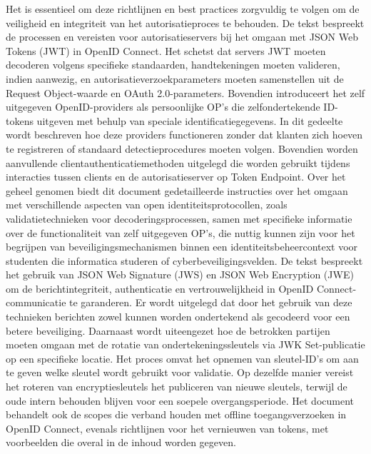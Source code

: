 Het is essentieel om deze richtlijnen en best practices zorgvuldig te volgen om de veiligheid en integriteit van het autorisatieproces te behouden.
\newline
De tekst bespreekt de processen en vereisten voor autorisatieservers bij het omgaan met JSON Web Tokens (JWT) in OpenID Connect. Het schetst dat servers JWT moeten decoderen volgens specifieke standaarden, handtekeningen moeten valideren, indien aanwezig, en autorisatieverzoekparameters moeten samenstellen uit de Request Object-waarde en OAuth 2.0-parameters.
\newline
Bovendien introduceert het zelf uitgegeven OpenID-providers als persoonlijke OP's die zelfondertekende ID-tokens uitgeven met behulp van speciale identificatiegegevens. In dit gedeelte wordt beschreven hoe deze providers functioneren zonder dat klanten zich hoeven te registreren of standaard detectieprocedures moeten volgen.
Bovendien worden aanvullende clientauthenticatiemethoden uitgelegd die worden gebruikt tijdens interacties tussen clients en de autorisatieserver op Token Endpoint.
\newline
Over het geheel genomen biedt dit document gedetailleerde instructies over het omgaan met verschillende aspecten van open identiteitsprotocollen, zoals validatietechnieken voor decoderingsprocessen, samen met specifieke informatie over de functionaliteit van zelf uitgegeven OP's, die nuttig kunnen zijn voor het begrijpen van beveiligingsmechanismen binnen een identiteitsbeheercontext voor studenten die informatica studeren of cyberbeveiligingsvelden.
\newline
De tekst bespreekt het gebruik van JSON Web Signature (JWS) en JSON Web Encryption (JWE) om de berichtintegriteit, authenticatie en vertrouwelijkheid in OpenID Connect-communicatie te garanderen. Er wordt uitgelegd dat door het gebruik van deze technieken berichten zowel kunnen worden ondertekend als gecodeerd voor een betere beveiliging.
\newline
Daarnaast wordt uiteengezet hoe de betrokken partijen moeten omgaan met de rotatie van ondertekeningssleutels via JWK Set-publicatie op een specifieke locatie. Het proces omvat het opnemen van sleutel-ID's om aan te geven welke sleutel wordt gebruikt voor validatie. Op dezelfde manier vereist het roteren van encryptiesleutels het publiceren van nieuwe sleutels, terwijl de oude intern behouden blijven voor een soepele overgangsperiode.
\newline
Het document behandelt ook de scopes die verband houden met offline toegangsverzoeken in OpenID Connect, evenals richtlijnen voor het vernieuwen van tokens, met voorbeelden die overal in de inhoud worden gegeven.
